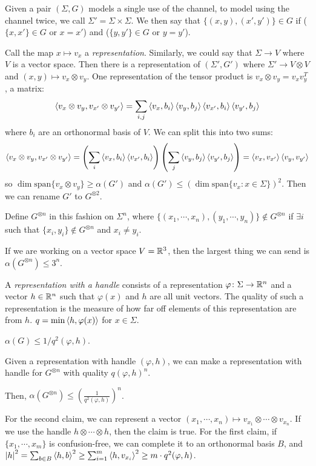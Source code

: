 \documentclass[a4paper,twoside,master.tex]{subfiles}
\begin{document}
Given a pair $ (\Sigma, G) $ models a single use of the channel, to model using the channel twice, we call $ \Sigma' = \Sigma \times \Sigma $. We then say that $ \{(x,y), (x',y')\} \in G $ if ($ \{x,x'\} \in G $ or $ x = x' $) and ($ \{y,y'\} \in G $ or $ y = y' $).

Call the map $ x \mapsto v_x $ a \textit{representation}. Similarly, we could say that $ \Sigma \to V $ where $ V $ is a vector space. Then there is a representation of $ (\Sigma', G') $ where $ \Sigma' \to V \otimes V $ and $ (x,y)\mapsto v_x \otimes v_y $. One representation of the tensor product is $ v_x \otimes v_y = v_x v_y^T $, a matrix:
\begin{equation}
    \ev{v_x \otimes v_y, v_{x'} \otimes v_{y'}} = \sum_{i,j} \ev{v_x, b_i} \ev{v_y, b_j} \ev{v_{x'}, b_i} \ev{v_{y'}, b_j}
\end{equation}
where $ b_i $ are an orthonormal basis of $ V $. We can split this into two sums:
\begin{equation}
    \ev{v_x \otimes v_y, v_{x'} \otimes v_{y'}} = \left( \sum_i \ev{v_x, b_i} \ev{v_{x'}, b_i} \right) \left( \sum_j \ev{v_y, b_j} \ev{v_{y'}, b_j} \right) = \ev{v_x, v_{x'}} \ev{v_y, v_{y'}}
\end{equation}
so $ \dim \text{span} \{v_x \otimes v_y\} \geq \alpha(G') $ and $ \alpha(G') \leq \left( \dim \text{span} \{v_x\colon x \in \Sigma\} \right)^2 $. Then we can rename $ G' $ to $ G^{\otimes 2} $.

Define $ G^{\otimes n} $ in this fashion on $ \Sigma^n $, where $ \{(x_1,\cdots,x_n), (y_1,\cdots,y_n)\} \notin G^{\otimes n} $ if $ \exists i $ such that $ \{x_i, y_i\} \notin G^{\otimes n} $ and $ x_i \neq y_i $. 

If we are working on a vector space $ V = \mathbb{R}^3 $, then the largest thing we can send is $ \alpha(G^{\otimes n}) \leq 3^n $.

A \textit{representation with a handle} consists of a representation $ \varphi \colon \Sigma \to \mathbb{R}^n $ and a vector $ h \in \mathbb{R}^n $ such that $ \varphi(x) $ and $ h $ are all unit vectors. The quality of such a representation is the measure of how far off elements of this representation are from $ h $. $ q = \min \ev{h, \varphi(x)} $ for $ x \in \Sigma $. 

\begin{claim}
    $ \alpha(G) \leq 1/q^2(\varphi, h) $. 
\end{claim}
\begin{claim}
    Given a representation with handle $ (\varphi, h) $, we can make a representation with handle for $ G^{\otimes n} $ with quality $ q(\varphi, h)^n $.
\end{claim}
Then, $ \alpha(G^{\otimes n}) \leq \left( \frac{1}{q^2(\varphi, h)} \right)^n $.

For the second claim, we can represent a vector $ (x_1, \cdots, x_n) \mapsto v_{x_1} \otimes \cdots \otimes v_{x_n} $. If we use the handle $ h \otimes \cdots \otimes h $, then the claim is true. For the first claim, if $ \{x_1, \cdots, x_m\} $ is confusion-free, we can complete it to an orthonormal basis $ B $, and $ \abs{h}^2 = \sum_{b \in B} \ev{h, b}^2 \geq \sum_{i=1}^{m} \ev{h, v_{x_i}}^2 \geq m \cdot q^2(\varphi, h) $.
\end{document}
